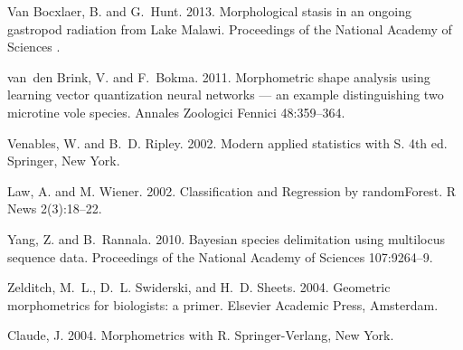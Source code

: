 \documentclass[12pt,letterpaper]{article}
\begin{document}
\begin{thebibliography}{77}
        {Van Bocxlaer}, B. and G.~Hunt. 2013. {Morphological stasis in an ongoing
        gastropod radiation from Lake Malawi}. Proceedings of the National Academy of
        Sciences .

        van~den Brink, V. and F.~Bokma. 2011. {Morphometric shape analysis using
          learning vector quantization neural networks — an example distinguishing
        two microtine vole species}. Annales Zoologici Fennici 48:359--364.

        Venables, W. and B.~D. Ripley. 2002. {Modern applied statistics with S}. 4th
        ed. Springer, New York.

        Law, A. and M. Wiener. 2002. {Classification and Regression by randomForest.} 
        R News 2(3):18--22.
        
        Yang, Z. and B.~Rannala. 2010. {Bayesian species delimitation using multilocus
        sequence data.} Proceedings of the National Academy of Sciences 107:9264--9.

        Zelditch, M.~L., D.~L. Swiderski, and H.~D. Sheets. 2004. {Geometric
        morphometrics for biologists: a primer}. Elsevier Academic Press, Amsterdam.

        Claude, J. 2004. {Morphometrics with R}. Springer-Verlang, New York.

    \end{thebibliography}
\end{document}
